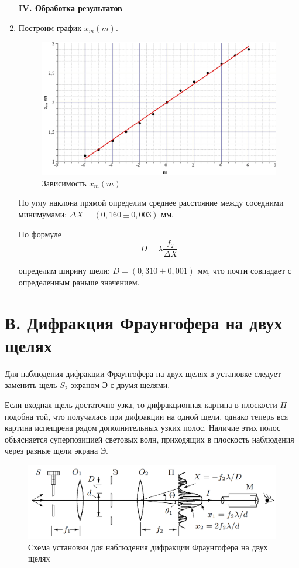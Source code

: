 \documentclass[a4paper,12pt]{article} %
\begin{document}
\begin{enumerate}
		
		\begin{center}
			\textbf{IV. Обработка результатов}
		\end{center}
		
		\item Построим график $x_m (m)$.
		\begin{figure}[h!]
			\centering
			\includegraphics[scale=0.62]{Pictures/X(m)}
			\caption{Зависимость $x_m(m)$}
		\end{figure}
		
		По углу наклона прямой определим среднее расстояние между соседними минимумами: $\Delta X = (0,160 \pm 0,003)$ мм. 
		
		По формуле 
		\begin{equation*}
			D = \lambda \frac{f_2}{\Delta X}
		\end{equation*}
	
		определим ширину щели: $D = (0,310 \pm 0,001)$ мм, что почти совпадает с определенным раньше значением.
	\end{enumerate}


	\section*{В. Дифракция Фраунгофера на двух щелях}
	
	Для наблюдения дифракции Фраунгофера на двух щелях в установке следует заменить щель $S_2$ экраном Э с двумя щелями. 
	
	Если входная щель достаточно узка, то дифракционная картина в плоскости $\Pi$ подобна той, что получалась при дифракции на одной щели, однако теперь вся картина испещрена рядом дополнительных узких полос. Наличие этих полос объясняется суперпозицией световых волн, приходящих в плоскость наблюдения через разные щели экрана Э.
	\begin{figure}[h!]
		\centering
		\includegraphics[scale=0.5]{Pictures/Double}
		\caption{Схема установки для наблюдения дифракции Фраунгофера на двух щелях}
	\end{figure}
\end{document}
